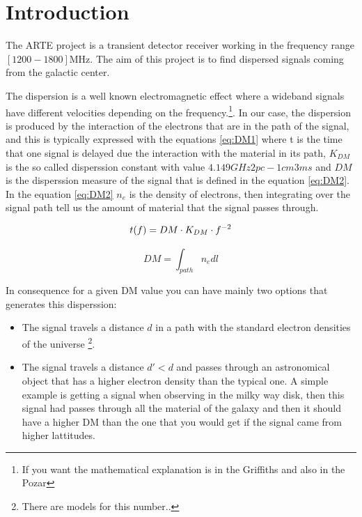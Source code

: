 \section{Introduction}


The ARTE project is a transient detector receiver working in the frequency range $[1200-1800]$MHz. The aim of this project is to find dispersed signals coming from the galactic center.


The dispersion is a well known electromagnetic effect where a wideband signals have different velocities depending on the frequency.\footnote{If you want the mathematical explanation is in the Griffiths and also in the Pozar}. In our case, the dispersion is produced by the interaction of the electrons that are in the path of the signal, and this is typically expressed with the equations \ref{eq:DM1} where t is the time that one signal is delayed due the interaction with the material in its path, $K_{DM}$ is the so called disperssion constant with value $4.149 GHz2 pc-1 cm3 ms$ and $DM$ is the disperssion measure of the signal that is defined in the equation \ref{eq:DM2}. In the equation \ref{eq:DM2} $n_e$ is the density of electrons, then integrating over the signal path tell us the amount of material that the signal passes through. 

\begin{equation}
    t(f) = DM \cdot K_{DM} \cdot f^{-2} \\
    \label{eq:DM1}
\end{equation}

\begin{equation}
    DM = \int_{path} n_e dl
    \label{eq:DM2}
\end{equation}

In consequence for a given DM value you can have mainly two options that generates this disperssion: 
\begin{itemize}
    \item The signal travels a distance $d$ in a path with the standard electron densities of the universe \footnote{There are models for this number..}.
    \item The signal travels a distance $d'<d$ and passes through an astronomical object that has a higher electron density than the typical one. A simple example is getting a signal when observing in the milky way disk, then this signal had passes through all the material of the galaxy and then it should have a higher DM than the one that you would get if the signal came from higher lattitudes.
\end{itemize}

